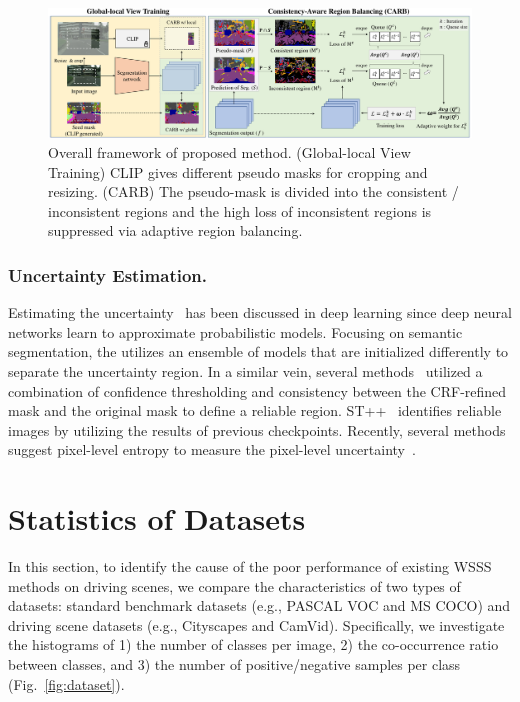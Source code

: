\documentclass[letterpaper]{article} %
\def\eg{e.g.} \def\Eg{E.g.}
\begin{document}
\begin{figure}[t!]
\centering
\includegraphics[width=17cm]{figures/fig_framework.pdf}
\caption{Overall framework of proposed method. (Global-local View Training) CLIP gives different pseudo masks for cropping and resizing. (CARB) The pseudo-mask is divided into the consistent / inconsistent regions and the high loss of inconsistent regions is suppressed via adaptive region balancing.}
\label{fig:framework}
\end{figure}

\subsubsection{Uncertainty Estimation.} Estimating the uncertainty~\cite{DBLP:conf/nips/KendallG17} has been discussed in deep learning since deep neural networks learn to approximate probabilistic models. Focusing on semantic segmentation, the \citeauthor{feng2022dmt} utilizes an ensemble of models that are initialized differently to separate the uncertainty region. In a similar vein, several methods~\cite{oh2021background,DBLP:conf/aaai/ZhangXWSH20} utilized a combination of confidence thresholding and consistency between the CRF-refined mask and the original mask to define a reliable region. ST++~\cite{yang2022st++} identifies reliable images by utilizing the results of previous checkpoints. Recently, several methods suggest pixel-level entropy to measure the pixel-level uncertainty~\cite{NEURIPS2020_f73b76ce,Huynh:CVPR22,li2022uncertainty, wang2022semi}.

\section{Statistics of Datasets}
In this section, to identify the cause of the poor performance of existing WSSS methods on driving scenes, we compare the characteristics of two types of datasets: standard benchmark datasets (\eg, PASCAL VOC and MS COCO) and driving scene datasets (\eg, Cityscapes and CamVid). Specifically, we investigate the histograms of 1) the number of classes per image, 2) the co-occurrence ratio between classes, and 3) the number of positive/negative samples per class (Fig.~\ref{fig:dataset}). 
\end{document}
